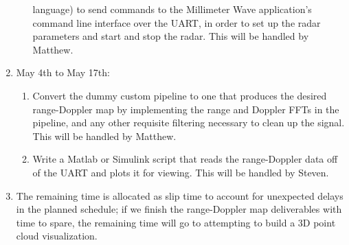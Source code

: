 \documentclass[12pt, oneside, titlepage, final]{article}
\begin{document}
\begin{enumerate}
\begin{enumerate}
					language) to send commands to the Millimeter Wave application's
					command line interface over the UART, in order to set up the radar
					parameters and start and stop the radar. This will be handled by
					Matthew.
			\end{enumerate}
		\item May 4th to May 17th:
			\begin{enumerate}
				\item Convert the dummy custom pipeline to one that produces the desired
					range-Doppler map by implementing the range and Doppler FFTs in the
					pipeline, and any other requisite filtering necessary to clean up the
					signal. This will be handled by Matthew.
				\item Write a Matlab or Simulink script that reads the range-Doppler data off
					of the UART and plots it for viewing. This will be handled by Steven.
			\end{enumerate}
		\item The remaining time is allocated as slip time to account for unexpected delays in the
			planned schedule; if we finish the range-Doppler map deliverables with time to spare,
			the remaining time will go to attempting to build a 3D point cloud visualization.
	\end{enumerate}
\end{document}
